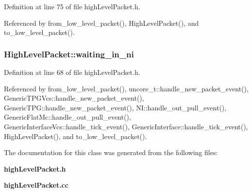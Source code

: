 Definition at line 75 of file highLevelPacket.h.

Referenced by from\_\-low\_\-level\_\-packet(), HighLevelPacket(), and to\_\-low\_\-level\_\-packet().
\subsubsection[{waiting\_\-in\_\-ni}]{ {\bf HighLevelPacket::waiting\_\-in\_\-ni}}\label{classHighLevelPacket_80531eda576b228669b9ed662e4863fc}




Definition at line 68 of file highLevelPacket.h.

Referenced by from\_\-low\_\-level\_\-packet(), uncore\_\-t::handle\_\-new\_\-packet\_\-event(), GenericTPGVcs::handle\_\-new\_\-packet\_\-event(), GenericTPG::handle\_\-new\_\-packet\_\-event(), NI::handle\_\-out\_\-pull\_\-event(), GenericFlatMc::handle\_\-out\_\-pull\_\-event(), GenericInterfaceVcs::handle\_\-tick\_\-event(), GenericInterface::handle\_\-tick\_\-event(), HighLevelPacket(), and to\_\-low\_\-level\_\-packet().

The documentation for this class was generated from the following files:\begin{CompactItemize}
\item 
{\bf highLevelPacket.h}\item 
{\bf highLevelPacket.cc}\end{CompactItemize}
